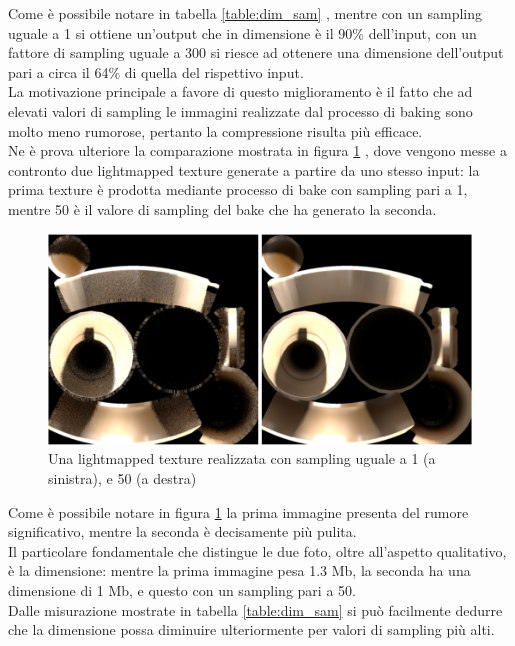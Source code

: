Come è possibile notare in tabella \ref{table:dim_sam} , mentre con un sampling uguale a 1 si ottiene un’output che in dimensione è il 90\% dell’input, con un fattore di sampling uguale a 300 si riesce ad ottenere una dimensione dell’output pari a circa il 64\% di quella del rispettivo input. 
\\
La motivazione principale a favore di questo miglioramento è il fatto che ad elevati valori di sampling le immagini realizzate dal processo di baking sono molto meno rumorose, pertanto la compressione risulta più efficace. 
\\
Ne è prova ulteriore la comparazione mostrata in figura \ref{fig:dim_sam} , dove vengono messe a contronto due lightmapped texture generate a partire da uno stesso input: la prima texture è prodotta mediante processo di bake con sampling pari a 1, mentre 50 è il valore di sampling del bake che ha generato la seconda.
\\
\begin{figure}[htb]
 \centering
 \includegraphics[width=1\linewidth]{images/chapter_prove_sperimentali/dim_sam.png}\hfill
 \caption[Confronto dimensione lightmapped texture]{Una lightmapped texture realizzata con sampling uguale a 1 (a sinistra), e 50 (a destra)}
 \label{fig:dim_sam}
\end{figure}

Come è possibile notare in figura \ref{fig:dim_sam} la prima immagine presenta del rumore significativo, mentre la seconda è decisamente più pulita.
\\ 
Il particolare fondamentale che distingue le due foto, oltre all’aspetto qualitativo, è la dimensione: mentre la prima immagine pesa 1.3 Mb, la seconda ha una dimensione di 1 Mb, e questo con un sampling pari a 50. 
\\
Dalle misurazione mostrate in tabella \ref{table:dim_sam} si può facilmente dedurre che la dimensione possa diminuire ulteriormente per valori di sampling più alti.